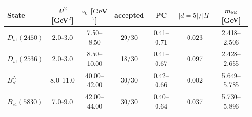 \begin{tabular}{lcccccc}
\toprule
State & $M^2$ [GeV$^2$] & $s_0$ [GeV$^2$] & accepted & PC & $|d=5|/|\Pi|$ & $m_{\rm SR}$ [GeV]\\
\midrule
$D_{s1}(2460)$ & 2.0--3.0 & 7.50--8.50 & 29/30 & 0.41--0.71 & 0.023 & 2.418--2.506 \\
$D_{s1}(2536)$ & 2.0--3.0 & 8.50--10.00 & 18/30 & 0.41--0.67 & 0.097 & 2.428--2.655 \\
$B_{s1}^{L}$ & 8.0--11.0 & 40.00--42.00 & 30/30 & 0.42--0.66 & 0.002 & 5.649--5.785 \\
$B_{s1}(5830)$ & 7.0--9.0 & 42.00--44.00 & 30/30 & 0.40--0.64 & 0.037 & 5.730--5.896 \\
\bottomrule
\end{tabular}
